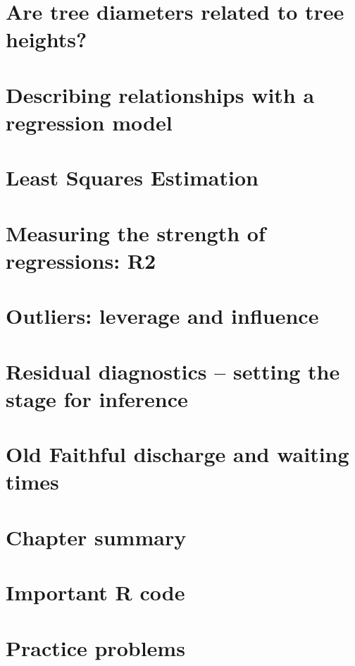 \documentclass[]{book}
\begin{document}
{{\section{Are tree diameters related to tree heights?}\label{section6-5}

\section{Describing relationships with a regression
model}\label{section6-6}

\section{Least Squares Estimation}\label{section6-7}

\section{Measuring the strength of regressions: R2}\label{section6-8}

\section{Outliers: leverage and influence}\label{section6-9}

\section{Residual diagnostics -- setting the stage for
inference}\label{section6-10}

\section{Old Faithful discharge and waiting times}\label{section6-11}

\section{Chapter summary}\label{section6-12}

\section{Important R code}\label{section6-13}

\section{Practice problems}\label{section6-14}

}}
\end{document}
